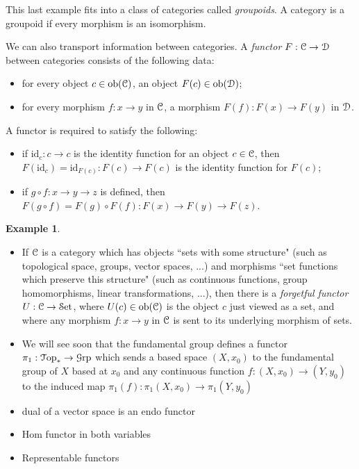 \documentclass[10pt]{amsart}
\newcommand{\euscr}[1]{\EuScript{#1}}
\theoremstyle{definition}
\newtheorem{ex}[thm]{Example}
\newcommand{\cdef}[1]{\textcolor{Bittersweet}{#1}}
\begin{document}
This last example fits into a class of categories called \cdef{\emph{groupoids}}. A category is a groupoid if every morphism is an isomorphism.

We can also transport information between categories. A \cdef{\emph{functor}} $F:\euscr{C} \to \euscr{D}$ between categories consists of the following data:
\begin{itemize}
    \item for every object $c \in \text{ob}(\euscr{C})$, an object $F(c) \in \text{ob}(\euscr{D})$;
    \item for every morphism $f:x \to y$ in $\euscr{C}$, a morphism $F(f):F(x) \to F(y)$ in $\euscr{D}$.
\end{itemize}
A functor is required to satisfy the following:
\begin{itemize}
    \item if $\text{id}_c:c \to c$ is the identity function for an object $c \in \euscr{C}$, then $F(\text{id}_c) = \text{id}_{F(c)} : F(c) \to F(c)$ is the identity function for $F(c)$;
    \item if $g \circ f:x \to y \to z$ is defined, then $F(g \circ f) = F(g) \circ F(f):F(x) \to F(y) \to F(z)$.
\end{itemize}

\begin{ex}
    \hfill
    \begin{itemize}
        \item If $\euscr{C}$ is a category which has objects ``sets with some structure" (such as topological space, groups, vector spaces, ...) and morphisms ``set functions which preserve this structure" (such as continuous functions, group homomorphisms, linear transformations, ...), then there is a \cdef{\emph{forgetful functor}} $U:\euscr{C} \to \euscr{S}\text{et}$, where $U(c) \in \text{ob}(\euscr{C})$ is the object $c$ just viewed as a set, and where any morphism $f:x \to y$ in $\euscr{C}$ is sent to its underlying morphism of sets.
        \item We will see soon that the fundamental group defines a functor $\pi_1:\euscr{T}\text{op}_* \to \euscr{G}\text{rp}$ which sends a based space $(X, x_0)$ to the fundamental group of $X$ based at $x_0$ and any continuous function $f:(X, x_0) \to (Y, y_0)$ to the induced map $\pi_1(f):\pi_1(X, x_0) \to \pi_1(Y, y_0)$
        \item dual of a vector space is an endo functor
        \item Hom functor in both variables
        \item Representable functors
    \end{itemize}
\end{ex}
\end{document}
